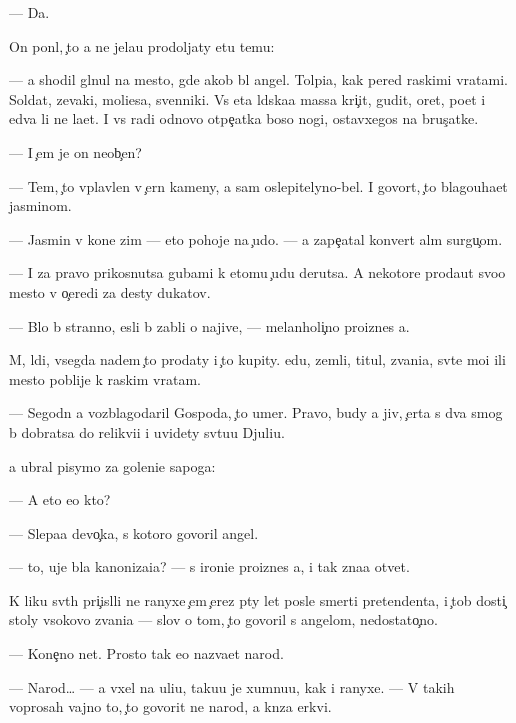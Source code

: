\documentclass[10pt]{book}
\begin{document}
— Da.

On pon{\ia}l, {\c}to {\y}a ne jela{\y}u prodoljaty etu temu:

— {\Y}a shodil gl{\ia}nul na mesto, gde {\y}akob{\yi} b{\yi}l angel. Tolpi{\x}a, kak pered ra{\y}skimi vratami. Soldat{\yi}, zevaki, mol{\ia}{\x}i{\y}esa, sv{\ia}{\x}enniki. Vs{\ia} eta l{\iu}dska{\y}a massa kri{\c}it, gudit, oret, po{\y}et i {\y}edva li ne la{\y}et. I vs{\e} radi odnovo otpe{\c}atka boso{\y} nogi, ostavxegos{\ia} na brus{\c}atke.

— I {\c}em je on neob{\yi}{\c}en?

— Tem, {\c}to vplavlen v {\c}ern{\yi}{\y} kameny, a sam oslepitelyno-bel. I govor{\ia}t, {\c}to blagouha{\y}et jasminom.

— Jasmin v kon{\q}e zim{\yi} — eto pohoje na {\c}udo. — {\Y}a zape{\c}atal konvert al{\yi}m surgu{\c}om.

— I za pravo prikosnutsa gubami k etomu {\c}udu derutsa. A nekotor{\yi}{\y}e proda{\y}ut svo{\y}o mesto v o{\c}eredi za des{\ia}ty dukatov.

— B{\yi}lo b{\yi} stranno, {\y}esli b{\yi} zab{\yi}li o najive, — melanholi{\c}no proiznes {\y}a.

M{\yi}, l{\iu}di, vsegda na{\y}dem {\c}to prodaty i {\c}to kupity. {\Y}edu, zemli, titul{\yi}, zvani{\y}a, sv{\ia}t{\yi}{\y}e mo{\x}i ili mesto poblije k ra{\y}skim vratam.

— Segodn{\ia} {\y}a vozblagodaril Gospoda, {\c}to umer. Pravo, budy {\y}a jiv, {\c}erta s dva smog b{\yi} dobratsa do relikvi{\y}i i uvidety sv{\ia}tu{\y}u Djuli{\y}u.

{\Y}a ubral pisymo za goleni{\x}e sapoga:

— A eto {\y}e{\x}o kto?

— Slepa{\y}a devo{\c}ka, s kotoro{\y} govoril angel.

— {\C}to, uje b{\yi}la kanoniza{\q}i{\y}a? — s ironi{\y}e{\y} proiznes {\y}a, i tak zna{\y}a otvet.

K liku sv{\ia}t{\yi}h pri{\c}isl{\ia}li ne ranyxe {\c}em {\c}erez p{\ia}ty let posle smerti pretendenta, i {\c}tob{\yi} dosti{\c} stoly v{\yi}sokovo zvani{\y}a — slov o tom, {\c}to govoril s angelom, nedostato{\c}no.

— Kone{\c}no net. Prosto tak {\y}e{\y}o naz{\yi}va{\y}et narod.

— Narod… — {\Y}a v{\yi}xel na uli{\q}u, taku{\y}u je xumnu{\y}u, kak i ranyxe. — V takih voprosah vajno to, {\c}to govorit ne narod, a kn{\ia}z{\y}a {\q}erkvi.
\end{document}
